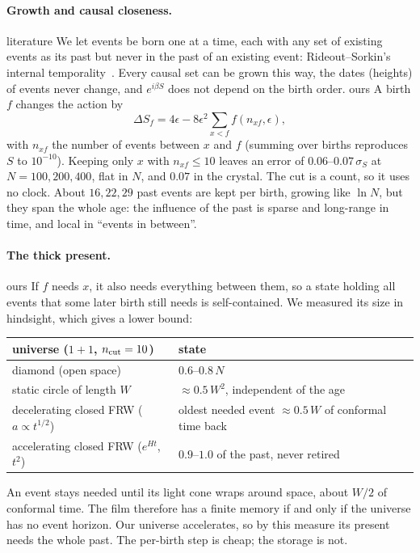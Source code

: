 \documentclass[11pt,a4paper]{article}
\newcommand{\tagbox}[2]{\textsf{\scriptsize\colorbox{#1!12}{\textcolor{#1!70!black}{#2}}}}
\newcommand{\lit}{\tagbox{blue}{literature}}
\newcommand{\ours}{\tagbox{orange}{ours}}
\begin{document}
\paragraph{Growth and causal closeness.} \lit{} We let events be born one at a time, each with any set of existing events as its past but never in the past of an existing event: Rideout--Sorkin's internal temporality~\cite{RideoutSorkin00}. Every causal set can be grown this way, the dates (heights) of events never change, and $e^{i\beta S}$ does not depend on the birth order. \ours{} A birth $f$ changes the action by
\begin{equation}
\Delta S_f = 4\epsilon - 8\epsilon^2\sum_{x<f} f(n_{xf},\epsilon),
\end{equation}
with $n_{xf}$ the number of events between $x$ and $f$ (summing over births reproduces $S$ to $10^{-10}$). Keeping only $x$ with $n_{xf}\le10$ leaves an error of $0.06$--$0.07\,\sigma_S$ at $N=100,200,400$, flat in $N$, and $0.07$ in the crystal. The cut is a count, so it uses no clock. About $16,22,29$ past events are kept per birth, growing like $\ln N$, but they span the whole age: the influence of the past is sparse and long-range in time, and local in ``events in between''.

\paragraph{The thick present.} \ours{} If $f$ needs $x$, it also needs everything between them, so a state holding all events that some later birth still needs is self-contained. We measured its size in hindsight, which gives a lower bound:
\begin{center}\small
\begin{tabular}{@{}ll@{}}
\toprule
universe ($1+1$, $n_{\rm cut}=10$) & state\\
\midrule
diamond (open space) & $0.6$--$0.8\,N$\\
static circle of length $W$ & $\approx0.5\,W^2$, independent of the age\\
decelerating closed FRW ($a\propto t^{1/2}$) & oldest needed event $\approx0.5\,W$ of conformal time back\\
accelerating closed FRW ($e^{Ht}$, $t^2$) & $0.9$--$1.0$ of the past, never retired\\
\bottomrule
\end{tabular}
\end{center}
An event stays needed until its light cone wraps around space, about $W/2$ of conformal time. The film therefore has a finite memory if and only if the universe has no event horizon. Our universe accelerates, so by this measure its present needs the whole past. The per-birth step is cheap; the storage is not.
\end{document}
